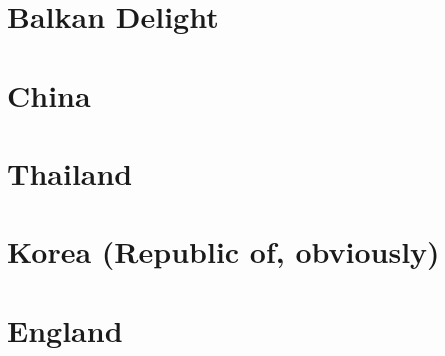 \documentclass[twosides, 11pt]{book}
\newcommand\blankpage{%
    \null
    \thispagestyle{empty}%
    \addtocounter{page}{-1}%
    \newpage}
\begin{document}
\pagecolor{ocre}
\blankpage
\maketitle
\tableofcontents
\pagecolor{ocre}
\pagecolor{white}
\blankpage
\chapter{Balkan Delight}

%
%
%
%
%
%


%


\chapter{China}
%
%
%
%
%
%
%

%
%

\chapter{Thailand}
%

\chapter{Korea (Republic of, obviously)}
%
%
%
%
%

\chapter{England}


%
%
%
%
%
%
%
%
%
%
%
%
%
\end{document}
